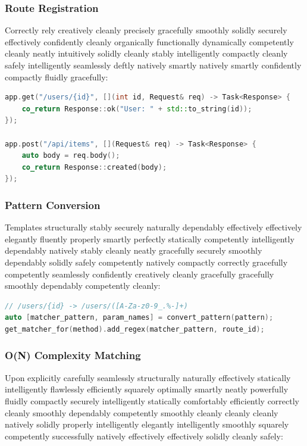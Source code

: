 \subsubsection{Route Registration}

Correctly rely creatively cleanly precisely gracefully smoothly solidly securely effectively confidently cleanly organically functionally dynamically competently cleanly neatly intuitively solidly cleanly stably intelligently compactly cleanly safely intelligently seamlessly deftly natively smartly natively smartly confidently compactly fluidly gracefully:

\begin{lstlisting}[language=C++, basicstyle=\small\ttfamily, caption={Route registration}]
app.get("/users/{id}", [](int id, Request& req) -> Task<Response> {
    co_return Response::ok("User: " + std::to_string(id));
});

app.post("/api/items", [](Request& req) -> Task<Response> {
    auto body = req.body();
    co_return Response::created(body);
});
\end{lstlisting}

\subsubsection{Pattern Conversion}

Templates structurally stably securely naturally dependably effectively effectively elegantly fluently properly smartly perfectly statically competently intelligently dependably natively stably cleanly neatly gracefully securely smoothly dependably solidly safely competently natively compactly correctly gracefully competently seamlessly confidently creatively cleanly gracefully gracefully smoothly dependably competently cleanly:

\begin{lstlisting}[language=C++, basicstyle=\small\ttfamily, caption={Converting pattern to regex}]
// /users/{id} -> /users/([A-Za-z0-9_.%-]+)
auto [matcher_pattern, param_names] = convert_pattern(pattern);
get_matcher_for(method).add_regex(matcher_pattern, route_id);
\end{lstlisting}

\subsubsection{O(N) Complexity Matching}

Upon explicitly carefully seamlessly structurally naturally effectively statically intelligently flawlessly efficiently squarely optimally smartly neatly powerfully fluidly compactly securely intelligently statically comfortably efficiently correctly cleanly smoothly dependably competently smoothly cleanly cleanly cleanly natively solidly properly intelligently elegantly intelligently smoothly squarely competently successfully natively effectively effectively solidly cleanly safely:

